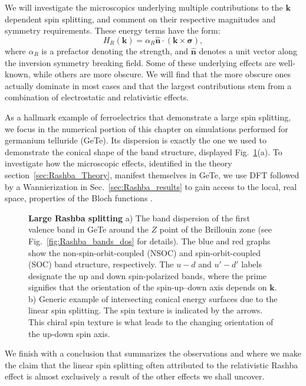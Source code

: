 We will investigate the microscopics underlying multiple contributions to the $\bm{k}$ dependent spin splitting, and comment on their respective magnitudes and symmetry requirements. 
These energy terms have the form:
\begin{equation}
	\label{eq:Rashba_form}
	H_R(\bm{k}) = \alpha_R \hat{\bm{n}} \cdot (\bm{k} \times \bm \sigma),
\end{equation}
where $\alpha_R$ is a prefactor denoting the strength, and $\hat{\bm n}$ denotes a unit vector along the inversion symmetry breaking field.
Some of these underlying effects are well-known, while others are more obscure.
We will find that the more obscure ones actually dominate in most cases and that the largest contributions stem from a combination of electrostatic and relativistic effects.

As a hallmark example of ferroelectrics that demonstrate a large spin splitting, we focus in the numerical portion of this chapter on simulations performed for germanium telluride (GeTe).
Its dispersion is exactly the one we used to demonstrate the conical shape of the band structure, displayed Fig.~\ref{fig:Rashba_intro_dispersion}(a).
To investigate how the microscopic effects, identified in the theory section~\ref{sec:Rashba_Theory}, manifest themselves in GeTe, we use DFT followed by a Wannierization in Sec.~\ref{sec:Rashba_results} to gain access to the local, real space, properties of the Bloch functions .
\begin{figure}[h]
	\caption{\label{fig:Rashba_intro_dispersion}
		{\bf Large Rashba splitting} a) The band dispersion of the first valence band in GeTe around the $Z$ point of the Brillouin zone (see Fig.~\ref{fig:Rashba_bands_dos} for details). The blue and red graphs show the non-spin-orbit-coupled (NSOC) and spin-orbit-coupled (SOC) band structure, respectively. The $u-d$ and $u'-d'$ labels designate the up and down spin-polarized bands, where the prime signifies that the orientation of the spin-up--down axis depends on $\bm{k}$. b) Generic example of intersecting conical energy surfaces due to the linear spin splitting. The spin texture is indicated by the arrows. This chiral spin texture is what leads to the changing orientation of the up-down spin axis.}
\end{figure}

We finish with a conclusion that summarizes the observations and where we make the claim that the linear spin splitting often attributed to the relativistic Rashba effect is almost exclusively a result of the other effects we shall uncover.

